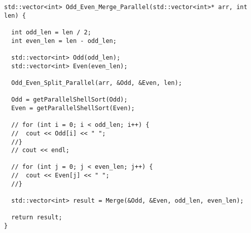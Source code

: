 \documentclass{report}
\begin{document}
\begin{lstlisting}
std::vector<int> Odd_Even_Merge_Parallel(std::vector<int>* arr, int len) {

  int odd_len = len / 2;
  int even_len = len - odd_len;

  std::vector<int> Odd(odd_len);
  std::vector<int> Even(even_len);

  Odd_Even_Split_Parallel(arr, &Odd, &Even, len);

  Odd = getParallelShellSort(Odd);
  Even = getParallelShellSort(Even);

  // for (int i = 0; i < odd_len; i++) {
  //  cout << Odd[i] << " ";
  //}
  // cout << endl;

  // for (int j = 0; j < even_len; j++) {
  //  cout << Even[j] << " ";
  //}

  std::vector<int> result = Merge(&Odd, &Even, odd_len, even_len);

  return result;
}

\end{lstlisting}
\end{document}
